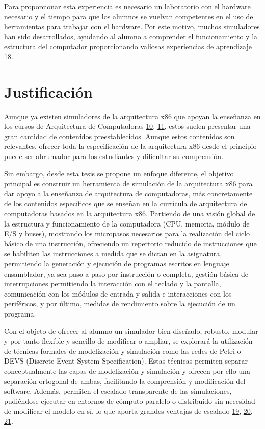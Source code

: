 \documentclass[12pt,twoside]{templates/unerthesis}
\begin{document}
Para proporcionar esta experiencia es necesario un laboratorio con el hardware necesario y el tiempo para que los alumnos se vuelvan competentes en el uso de herramientas para trabajar con el hardware. Por este motivo, muchos simuladores han sido desarrollados, ayudando al alumno a comprender el funcionamiento y la estructura del computador proporcionando valiosas experiencias de aprendizaje \protect\hyperlink{ref-skrien_cpu_2001}{18}.

\hypertarget{justificaciuxf3n}{%
\section{Justificación}\label{justificaciuxf3n}}

Aunque ya existen simuladores de la arquitectura x86 que apoyan la enseñanza en los cursos de Arquitectura de Computadoras \protect\hyperlink{ref-radivojevic_design_2011}{10}, \protect\hyperlink{ref-nikolic_survey_2009}{11}, estos suelen presentar una gran cantidad de contenidos preestablecidos. Aunque estos contenidos son relevantes, ofrecer toda la especificación de la arquitectura x86 desde el principio puede ser abrumador para los estudiantes y dificultar su comprensión.

Sin embargo, desde esta tesis se propone un enfoque diferente, el objetivo principal es construir un herramienta de simulación de la arquitectura x86 para dar apoyo a la enseñanza de arquitectura de computadoras, más concretamente de los contenidos específicos que se enseñan en la currícula de arquitectura de computadoras basados en la arquitectura x86. Partiendo de una visión global de la estructura y funcionamiento de la computadora (CPU, memoria, módulo de E/S y buses), mostrando los micropasos necesarios para la realización del ciclo básico de una instrucción, ofreciendo un repertorio reducido de instrucciones que se habiliten las instrucciones a medida que se dictan en la asignatura, permitiendo la generación y ejecución de programas escritos en lenguaje ensamblador, ya sea paso a paso por instrucción o completa, gestión básica de interrupciones permitiendo la interacción con el teclado y la pantalla, comunicación con los módulos de entrada y salida e interacciones con los periféricos, y por último, medidas de rendimiento sobre la ejecución de un programa.

Con el objeto de ofrecer al alumno un simulador bien diseñado, robusto, modular y por tanto flexible y sencillo de modificar o ampliar, se explorará la utilización de técnicas formales de modelización y simulación como las redes de Petri o DEVS (Discrete Event System Specification). Estas técnicas permiten separar conceptualmente las capas de modelización y simulación y ofrecen por ello una separación ortogonal de ambas, facilitando la comprensión y modificación del software. Además, permiten el escalado transparente de las simulaciones, pudiéndose ejecutar en entornos de cómputo paralelo o distribuido sin necesidad de modificar el modelo en sí, lo que aporta grandes ventajas de escalado \protect\hyperlink{ref-peterson_petri_1981}{19}, \protect\hyperlink{ref-zeigler_theory_2000}{20}, \protect\hyperlink{ref-zeigler_theory_2018}{21}.
\end{document}
